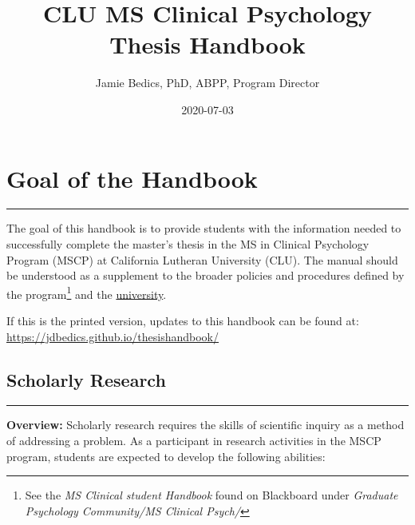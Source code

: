\documentclass[
  openany]{book}
\title{CLU MS Clinical Psychology Thesis Handbook}
\author{Jamie Bedics, PhD, ABPP, Program Director}
\date{2020-07-03}
\begin{document}
\maketitle

{
\setcounter{tocdepth}{1}
\tableofcontents
}
\hypertarget{goal-of-the-handbook}{%
\chapter{Goal of the Handbook}\label{goal-of-the-handbook}}

\begin{center}\rule{0.5\linewidth}{0.5pt}\end{center}

The goal of this handbook is to provide students with the information needed to successfully complete the master's thesis in the MS in Clinical Psychology Program (MSCP) at California Lutheran University (CLU). The manual should be understood as a supplement to the broader policies and procedures defined by the program\footnote{See the \emph{MS Clinical student Handbook} found on Blackboard under \emph{Graduate Psychology Community/MS Clinical Psych/}} and the \href{https://www.callutheran.edu/students/student-conduct/student-handbook.html}{university}.

If this is the printed version, updates to this handbook can be found at: \url{https://jdbedics.github.io/thesishandbook/}

\hypertarget{scholarly-research}{%
\section{Scholarly Research}\label{scholarly-research}}

\begin{center}\rule{0.5\linewidth}{0.5pt}\end{center}

\textbf{Overview:} Scholarly research requires the skills of scientific inquiry as a method of addressing a problem. As a participant in research activities in the MSCP program, students are expected to develop the following abilities:
\end{document}
